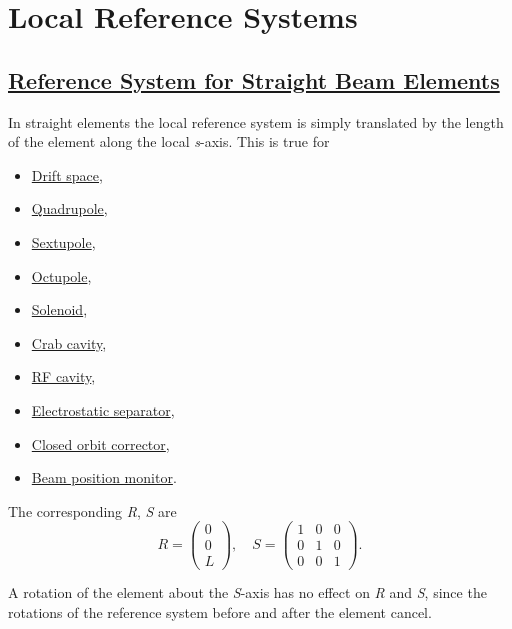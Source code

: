 
\section{Local Reference Systems}
\label{sec:local_ref}

\subsection{\href{straight}{Reference System for Straight Beam
    Elements}} 
\label{subsec:local_straight}
In straight elements the local reference system is simply translated by
the length of the element along the local \textit{s}-axis. This is true
for  
\begin{itemize}
   \item \href{drift.html}{Drift space}, 
   \item \href{quadrupole.html}{Quadrupole}, 
   \item \href{sextupole.html}{Sextupole}, 
   \item \href{octupole.html}{Octupole}, 
   \item \href{solenoid.html}{Solenoid}, 
   \item \href{crabcavity.html}{Crab cavity}, 
   \item \href{cavity.html}{RF cavity}, 
   \item \href{separator.html}{Electrostatic separator}, 
   \item \href{kickers.html}{Closed orbit corrector}, 
   \item \href{monitors.html}{Beam position monitor}. 
\end{itemize} 

The corresponding \textit{R}, \textit{S} are 
\[
R =
 \begin{pmatrix}
  0 \\
  0 \\
  L
 \end{pmatrix}
, \quad
S =
 \begin{pmatrix}
  1 & 0 &  0 \\
  0 & 1 &  0 \\
  0 & 0 &  1
 \end{pmatrix}
.
\]

A rotation of the element about the \textit{S}-axis has no effect on
\textit{R} and \textit{S}, since the rotations of the reference system
before and after the element cancel.  

